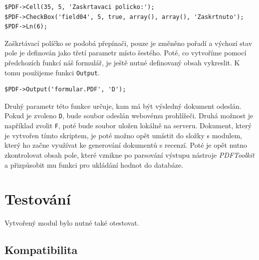 \documentclass[czech,BP]{thesiskiv}
\begin{document}
\begin{lstlisting}
$PDF->Cell(35, 5, 'Zaskrtavaci policko:');
$PDF->CheckBox('field04', 5, true, array(), array(), 'Zaskrtnuto');
$PDF->Ln(6);
\end{lstlisting}
Zaškrtávací políčko se podobá přepínači, pouze je změněno pořadí a výchozí stav pole je definován jako třetí parametr místo šestého. Poté, co vytvoříme pomocí předchozích funkcí náš formulář, je ještě nutné definovaný obsah vykreslit. K tomu použijeme funkci \texttt{Output}.
\begin{lstlisting}
$PDF->Output('formular.PDF', 'D');
\end{lstlisting}
Druhý parametr této funkce určuje, kam má být výsledný dokument odeslán. Pokud je zvoleno \texttt{D}, bude soubor odeslán webovému prohlížeči. Druhá možnost je například zvolit \texttt{F}, poté bude soubor uložen lokálně na serveru.
Dokument, který je vytvořen tímto skriptem, je poté možno opět umístit do složky s modulem, který ho začne využívat ke generování dokumentů s recenzí. Poté je opět nutno zkontrolovat obsah pole, které vznikne po parsování výstupu nástroje \emph{PDFToolkit} a přizpůsobit mu funkci pro ukládání hodnot do databáze.
\chapter{Testování}
Vytvořený modul bylo nutné také otestovat. 
\section{Kompatibilita}
\end{document}
